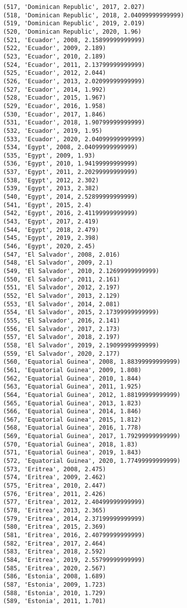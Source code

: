 \documentclass[11pt]{article}
\begin{document}
\begin{Verbatim}[commandchars=\\\{\}]
(517, 'Dominican Republic', 2017, 2.027)
(518, 'Dominican Republic', 2018, 2.04099999999999)
(519, 'Dominican Republic', 2019, 2.019)
(520, 'Dominican Republic', 2020, 1.96)
(521, 'Ecuador', 2008, 2.15899999999999)
(522, 'Ecuador', 2009, 2.189)
(523, 'Ecuador', 2010, 2.189)
(524, 'Ecuador', 2011, 2.13799999999999)
(525, 'Ecuador', 2012, 2.044)
(526, 'Ecuador', 2013, 2.02099999999999)
(527, 'Ecuador', 2014, 1.992)
(528, 'Ecuador', 2015, 1.967)
(529, 'Ecuador', 2016, 1.958)
(530, 'Ecuador', 2017, 1.846)
(531, 'Ecuador', 2018, 1.90799999999999)
(532, 'Ecuador', 2019, 1.95)
(533, 'Ecuador', 2020, 2.04099999999999)
(534, 'Egypt', 2008, 2.04099999999999)
(535, 'Egypt', 2009, 1.93)
(536, 'Egypt', 2010, 1.94199999999999)
(537, 'Egypt', 2011, 2.20299999999999)
(538, 'Egypt', 2012, 2.302)
(539, 'Egypt', 2013, 2.382)
(540, 'Egypt', 2014, 2.52899999999999)
(541, 'Egypt', 2015, 2.4)
(542, 'Egypt', 2016, 2.41199999999999)
(543, 'Egypt', 2017, 2.419)
(544, 'Egypt', 2018, 2.479)
(545, 'Egypt', 2019, 2.398)
(546, 'Egypt', 2020, 2.45)
(547, 'El Salvador', 2008, 2.016)
(548, 'El Salvador', 2009, 2.1)
(549, 'El Salvador', 2010, 2.12699999999999)
(550, 'El Salvador', 2011, 2.161)
(551, 'El Salvador', 2012, 2.197)
(552, 'El Salvador', 2013, 2.129)
(553, 'El Salvador', 2014, 2.081)
(554, 'El Salvador', 2015, 2.17399999999999)
(555, 'El Salvador', 2016, 2.141)
(556, 'El Salvador', 2017, 2.173)
(557, 'El Salvador', 2018, 2.197)
(558, 'El Salvador', 2019, 2.19099999999999)
(559, 'El Salvador', 2020, 2.177)
(560, 'Equatorial Guinea', 2008, 1.88399999999999)
(561, 'Equatorial Guinea', 2009, 1.808)
(562, 'Equatorial Guinea', 2010, 1.844)
(563, 'Equatorial Guinea', 2011, 1.925)
(564, 'Equatorial Guinea', 2012, 1.88199999999999)
(565, 'Equatorial Guinea', 2013, 1.823)
(566, 'Equatorial Guinea', 2014, 1.846)
(567, 'Equatorial Guinea', 2015, 1.812)
(568, 'Equatorial Guinea', 2016, 1.778)
(569, 'Equatorial Guinea', 2017, 1.79299999999999)
(570, 'Equatorial Guinea', 2018, 1.83)
(571, 'Equatorial Guinea', 2019, 1.843)
(572, 'Equatorial Guinea', 2020, 1.77499999999999)
(573, 'Eritrea', 2008, 2.475)
(574, 'Eritrea', 2009, 2.462)
(575, 'Eritrea', 2010, 2.447)
(576, 'Eritrea', 2011, 2.426)
(577, 'Eritrea', 2012, 2.40499999999999)
(578, 'Eritrea', 2013, 2.365)
(579, 'Eritrea', 2014, 2.37199999999999)
(580, 'Eritrea', 2015, 2.369)
(581, 'Eritrea', 2016, 2.40799999999999)
(582, 'Eritrea', 2017, 2.464)
(583, 'Eritrea', 2018, 2.592)
(584, 'Eritrea', 2019, 2.55799999999999)
(585, 'Eritrea', 2020, 2.567)
(586, 'Estonia', 2008, 1.689)
(587, 'Estonia', 2009, 1.723)
(588, 'Estonia', 2010, 1.729)
(589, 'Estonia', 2011, 1.701)

\end{Verbatim}
\end{document}
